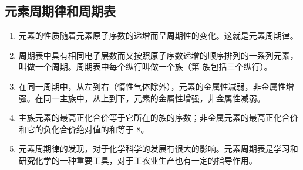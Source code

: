 \subsection{元素周期律和周期表}
\begin{enumerate}
  \item 元素的性质随着元素原子序数的递增而呈周期性的变化。这就是元素周期律。
  \item 周期表中具有相同电子层数而又按照原子序数递增的顺序排列的一系列元素，叫做一个周期。周期表中每个纵行叫做一个族（第  族包括三个纵行）。
  \item 在同一周期中，从左到右（惰性气体除外），元素的金属性减弱，非金属性增强。在同一主族中，从上到下，元素的金属性增强，非金属性减弱。
  \item 主族元素的最高正化合价等于它所在的族的序数；非金属元素的最高正化合价和它的负化合价绝对值的和等于 8。
  \item 元素周期律的发现，对于化学科学的发展有很大的影响。元素周期表是学习和研究化学的一种重要工具，对于工农业生产也有一定的指导作用。
\end{enumerate}
